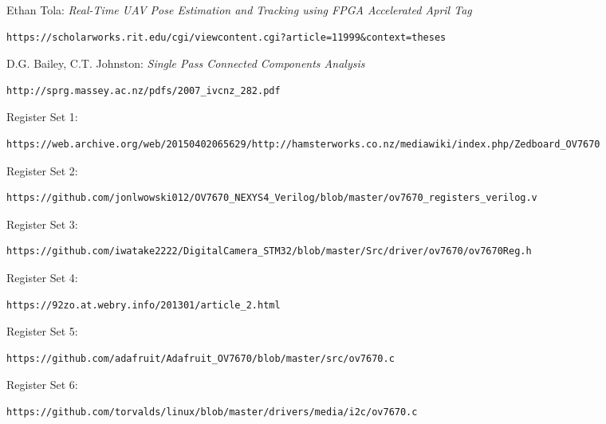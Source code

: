 \documentclass{IEEEtran}
\begin{document}
\begin{thebibliography}{99}
	Ethan Tola: \textit{Real-Time UAV Pose Estimation and Tracking using FPGA Accelerated April Tag}\begin{verbatim}https://scholarworks.rit.edu/cgi/viewcontent.cgi?article=11999&context=theses\end{verbatim}
	
	D.G. Bailey, C.T. Johnston: \textit{Single Pass Connected Components Analysis}\begin{verbatim}http://sprg.massey.ac.nz/pdfs/2007_ivcnz_282.pdf\end{verbatim}
	
	
	Register Set 1: \begin{verbatim}https://web.archive.org/web/20150402065629/http://hamsterworks.co.nz/mediawiki/index.php/Zedboard_OV7670\end{verbatim}
	Register Set 2: \begin{verbatim}https://github.com/jonlwowski012/OV7670_NEXYS4_Verilog/blob/master/ov7670_registers_verilog.v\end{verbatim}
	Register Set 3: \begin{verbatim}https://github.com/iwatake2222/DigitalCamera_STM32/blob/master/Src/driver/ov7670/ov7670Reg.h\end{verbatim}
	Register Set 4: \begin{verbatim}https://92zo.at.webry.info/201301/article_2.html\end{verbatim}
	Register Set 5: \begin{verbatim}https://github.com/adafruit/Adafruit_OV7670/blob/master/src/ov7670.c\end{verbatim}
	Register Set 6: \begin{verbatim}https://github.com/torvalds/linux/blob/master/drivers/media/i2c/ov7670.c\end{verbatim}
	
	
    \end{thebibliography}
\end{document}
